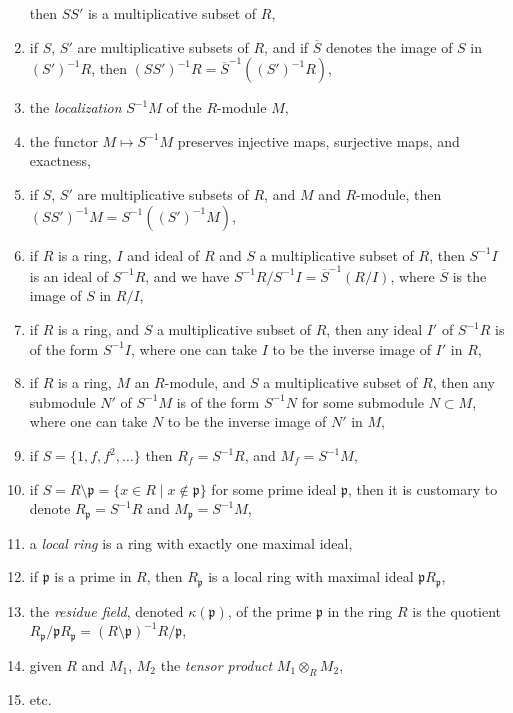 \begin{enumerate}
then $SS'$ is a multiplicative subset of $R$,
\label{item-products-multiplicative-subsets}
\item if $S$, $S'$ are multiplicative subsets of $R$,
and if $\overline{S}$ denotes the image of $S$ in $(S')^{-1}R$,
then $(SS')^{-1}R = \overline{S}^{-1}((S')^{-1}R)$,
\label{item-localization-localization}
\item the {\it localization} $S^{-1}M$ of the $R$-module $M$,
\label{item-localization-module}
\item the functor $M \mapsto S^{-1}M$ preserves injective maps,
surjective maps, and exactness,
\label{item-localization-exact}
\item if $S$, $S'$ are multiplicative subsets of $R$,
and $M$ and $R$-module, then $(SS')^{-1}M =
S^{-1}((S')^{-1}M)$,
\label{item-localization-localization-module}
\item if $R$ is a ring, $I$ and ideal of $R$ and $S$ a multiplicative
subset of $R$, then $S^{-1}I$ is an ideal of $S^{-1}R$, and we have
$S^{-1}R/S^{-1}I = \overline{S}^{-1}(R/I)$, where $\overline{S}$
is the image of $S$ in $R/I$,
\label{item-localize-ideal}
\item if $R$ is a ring, and $S$ a multiplicative
subset of $R$, then any ideal $I'$ of $S^{-1}R$ is
of the form $S^{-1}I$, where one can take $I$ to be
the inverse image of $I'$ in $R$,
\label{item-ideal-in-localization}
\item if $R$ is a ring, $M$ an $R$-module, and $S$ a multiplicative
subset of $R$, then any submodule $N'$ of $S^{-1}M$ is of the form
$S^{-1}N$ for some submodule $N \subset M$, where
one can take $N$ to be the inverse image of $N'$ in $M$,
\label{item-submodule-in-localization}
\item if $S = \{1, f, f^2, \ldots\}$ then $R_f = S^{-1}R$, and
$M_f = S^{-1}M$,
\label{item-localize-f}
\item if $S = R \setminus \mathfrak p = \{x\in R \mid x\not\in \mathfrak p\}$
for some prime ideal $\mathfrak p$,
then it is customary to denote $R_{\mathfrak p} = S^{-1}R$
and $M_{\mathfrak p} = S^{-1}M$,
\label{item-localize-p}
\item a {\it local ring} is a ring with exactly one maximal ideal,
\label{item-local-ring}
\item if $\mathfrak p$ is a prime in $R$, then $R_{\mathfrak p}$ is
a local ring with maximal ideal $\mathfrak p R_{\mathfrak p}$,
\label{item-localize-p-local-ring}
\item the {\it residue field}, denoted $\kappa(\mathfrak p)$,
of the prime $\mathfrak p$ in the
ring $R$ is the quotient $R_{\mathfrak p}/{\mathfrak p}R_{\mathfrak p}
= (R \setminus \mathfrak p)^{-1}R/{\mathfrak p}$,
\label{item-residue-field}
\item given $R$ and $M_1$, $M_2$ the {\it tensor product}
$M_1 \otimes_R M_2$,
\label{item-tensor-product}
\item etc.
\end{enumerate}
